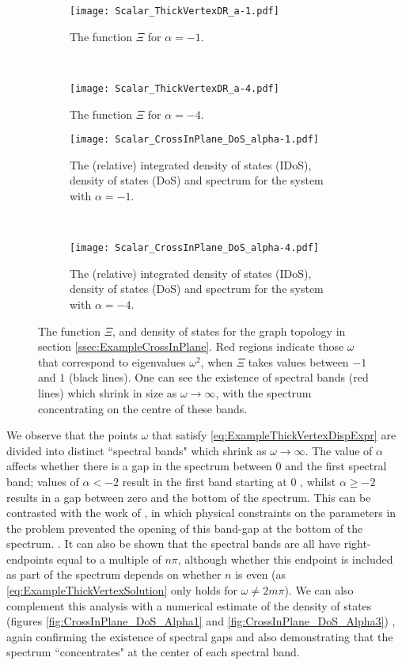\begin{figure}[t!]
	\centering
	\begin{subfigure}[t]{0.45\textwidth}
		\centering
		\texttt{[image: Scalar\_ThickVertexDR\_a-1.pdf]}
		\caption{\label{fig:Scalar_ThickVertexDR_a-1} The function $\Xi$ for $\alpha=-1$.}
	\end{subfigure}
	~
	\begin{subfigure}[t]{0.45\textwidth}
		\centering
		\texttt{[image: Scalar\_ThickVertexDR\_a-4.pdf]}
		\caption{\label{fig:Scalar_ThickVertexDR_a-4} The function $\Xi$ for $\alpha=-4$.}
	\end{subfigure}
	\newline
	\begin{subfigure}[t]{0.45\textwidth}
		\centering
		\texttt{[image: Scalar\_CrossInPlane\_DoS\_alpha-1.pdf]}
		\caption{\label{fig:Scalar_CrossInPlane_DoS_alpha-1} The (relative) integrated density of states (IDoS), density of states (DoS) and spectrum for the system with $\alpha=-1$.}
	\end{subfigure}
	~
	\begin{subfigure}[t]{0.45\textwidth}
		\centering
		\texttt{[image: Scalar\_CrossInPlane\_DoS\_alpha-4.pdf]}
		\caption{\label{fig:Scalar_CrossInPlane_DoS_alpha-4} The (relative) integrated density of states (IDoS), density of states (DoS) and spectrum for the system with $\alpha=-4$.}
	\end{subfigure}	
	\caption{\label{fig:Scalar_ThickVertexAllResults} The function $\Xi$, and density of states for the graph topology in section \ref{ssec:ExampleCrossInPlane}.
	Red regions indicate those $\omega$ that correspond to eigenvalues $\omega^2$, when $\Xi$ takes values between $-1$ and $1$ (black lines).
	One can see the existence of spectral bands (red lines) which shrink in size as $\omega\rightarrow\infty$, with the spectrum concentrating on the centre of these bands.}
\end{figure}
We observe that the points $\omega$ that satisfy \eqref{eq:ExampleThickVertexDispExpr} are divided into distinct ``spectral bands" which shrink as $\omega\rightarrow\infty$.
The value of $\alpha$ affects whether there is a gap in the spectrum between 0 and the first spectral band; values of $\alpha<-2$ result in the first band starting at 0 , whilst $\alpha\geq -2$ results in a gap between zero and the bottom of the spectrum. 
This can be contrasted with the work of \cite{cherednichenko2019time}, in which physical constraints on the parameters in the problem prevented the opening of this band-gap at the bottom of the spectrum. .
It can also be shown that the spectral bands are all have right-endpoints equal to a multiple of $n\pi$, although whether this endpoint is included as part of the spectrum depends on whether $n$ is even (as \eqref{eq:ExampleThickVertexSolution} only holds for $\omega\neq 2m\pi$).
We can also complement this analysis with a numerical estimate of the density of states (figures \ref{fig:CrossInPlane_DoS_Alpha1} and \ref{fig:CrossInPlane_DoS_Alpha3}) , again confirming the existence of spectral gaps and also demonstrating that the spectrum ``concentrates" at the center of each spectral band.